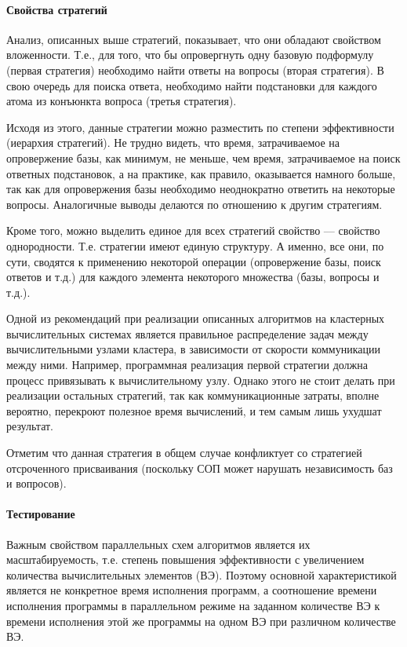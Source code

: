 \paragraph{Свойства стратегий}

Анализ, описанных выше стратегий, показывает, что они обладают свойством вложенности. Т.е., для того, что бы опровергнуть одну базовую подформулу (первая стратегия) необходимо найти ответы на вопросы (вторая стратегия). В свою очередь для поиска ответа, необходимо найти подстановки для каждого атома из конъюнкта вопроса (третья стратегия).

Исходя из этого, данные стратегии можно разместить по степени эффективности (иерархия стратегий). Не трудно видеть, что время, затрачиваемое на опровержение базы, как минимум, не меньше, чем время, затрачиваемое на поиск ответных подстановок, а на практике, как правило, оказывается намного больше, так как для опровержения базы необходимо неоднократно ответить на некоторые вопросы. Аналогичные выводы делаются по отношению к другим стратегиям.

Кроме того, можно выделить единое для всех стратегий свойство –-- свойство однородности. Т.е. стратегии имеют единую структуру. А именно, все они, по сути, сводятся к применению некоторой операции (опровержение базы, поиск ответов и т.д.) для каждого элемента некоторого множества (базы, вопросы и т.д.).

Одной из рекомендаций при реализации описанных алгоритмов на кластерных вычислительных системах является правильное распределение задач между вычислительными узлами кластера, в зависимости от скорости коммуникации между ними. Например, программная реализация первой стратегии должна процесс привязывать к вычислительному узлу. Однако этого не стоит делать при реализации остальных стратегий, так как коммуникационные затраты, вполне вероятно, перекроют полезное время вычислений, и тем самым лишь ухудшат результат.

Отметим что данная стратегия в общем случае конфликтует со стратегией отсроченного присваивания (поскольку СОП может нарушать независимость баз и вопросов). 

\paragraph{Тестирование}
Важным свойством параллельных схем алгоритмов является их масштабируемость, т.е. степень повышения эффективности с увеличением количества вычислительных элементов (ВЭ). Поэтому основной характеристикой является не конкретное время исполнения программ, а соотношение времени исполнения программы в параллельном режиме на заданном количестве ВЭ к времени исполнения этой же программы на одном ВЭ при различном количестве ВЭ.

